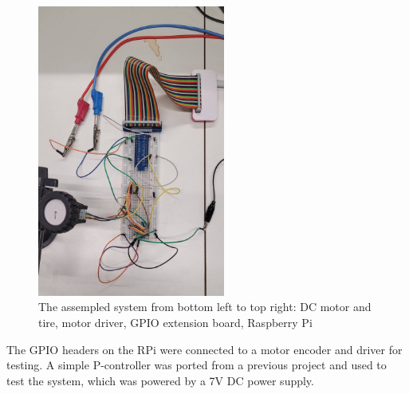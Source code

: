 \documentclass{article}
\begin{document}
\begin{figure}[h]
    \begin{center}
        \includegraphics[width=0.55\textwidth]{figures/setup.jpeg}
    \end{center}
    \caption{The assempled system from bottom left to top right: DC motor and tire, motor
    driver, GPIO extension board, Raspberry Pi}\label{fig:assembly}
\end{figure}

The GPIO headers on the RPi were connected to a motor encoder and driver for testing. A
simple P-controller was ported from a previous project and used to test the system, which
was powered by a 7V DC power supply.
\end{document}
